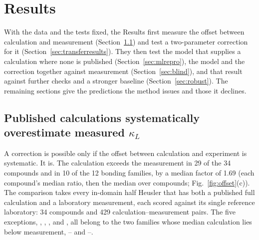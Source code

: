 
\section{Results}
\label{sec:results}

With the data and the tests fixed, the Results first measure the offset between calculation and
measurement (Section~\ref{sec:offset}) and test a two-parameter correction for it
(Section~\ref{sec:transferresults}). They then test the model that supplies a calculation where none
is published (Section~\ref{sec:mlrepro}), the model and the correction together against measurement
(Section~\ref{sec:blind}), and that result against further checks and a stronger baseline
(Section~\ref{sec:robust}). The remaining sections give the predictions the method issues and those
it declines.

\subsection{Published calculations systematically overestimate measured \texorpdfstring{$\kappa_L$}{kappa\_L}}
\label{sec:offset}

A correction is possible only if the offset between calculation and experiment is systematic. It
is. The calculation exceeds the measurement in \num{29} of the \num{34} compounds and in \num{10} of
the \num{12} bonding families, by a median factor of \num{1.69} (each compound's median ratio, then
the median over compounds; Fig.~\ref{fig:offset}(c)). The comparison takes every in-domain
half Heusler that has both a published full calculation and a laboratory measurement, each scored
against its single reference laboratory: \num{34} compounds and \num{429} calculation--measurement
pairs. The
five exceptions, , , ,  and , all belong to
the two families whose median calculation lies below measurement, -- and
--.

